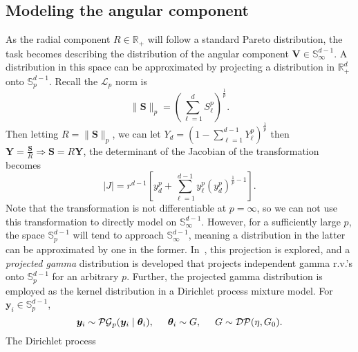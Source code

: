 
\subsection{Modeling the angular component}
As the radial component $R \in {\mathbb R}_+$ will follow a standard Pareto 
    distribution, the task becomes describing the distribution of the angular component 
    $\bm{V}\in {\mathbb S}_{\infty}^{d-1}$.  A distribution in this space can be
    approximated by projecting a distribution in $\mathbb{R}_+^d$ onto $\mathbb{S}_{p}^{d-1}$.
    Recall the $\mathcal{L}_p$ norm is 
    \[
        \lVert \bm{S} \rVert_p = \left(\sum_{\ell = 1}^d S_{\ell}^p\right)^{\frac{1}{p}}.
    \]
    Then letting $R = \lVert \bm{S}\rVert_p$, we can let 
    $Y_d = \left(1 - \sum_{\ell = 1}^{d-1}Y_{\ell}^{p}\right)^{\frac{1}{p}}$ then $\bm{Y} = \frac{\bm{S}}{R}\Rightarrow \bm{S} = R\bm{Y}$, 
    the determinant of the Jacobian of the transformation becomes
    \[
        \lvert J \rvert = r^{d-1}\left[y_d^p + \sum_{\ell = 1}^{d-1}y_{\ell}^p\left(y_d^p\right)^{\frac{1}{p} - 1} \right].
    \]
    Note that the transformation is not differentiable at $p = \infty$, so we can not use this 
    transformation to directly model on ${\mathbb S}_{\infty}^{d-1}$.
    However, for a sufficiently large $p$, the space ${\mathbb S}_p^{d-1}$ will tend
    to approach $\mathbb{S}_{\infty}^{d-1}$, meaning a distribution in the latter can be 
    approximated by one in the former.  In~\cite{trubey:pg}, this projection is explored, and
    a \emph{projected gamma} distribution is developed that projects independent gamma r.v.'s 
    onto $\mathbb{S}_{p}^{d-1}$ for an arbitrary $p$.  Further, the projected gamma distribution is
    employed as the kernel distribution in a Dirichlet process mixture model.  For $\bm{y}_i\in \mathbb{S}_{p}^{d-1}$,
    \[
        \bm{y}_i \sim \mathcal{PG}_{p}(\bm{y}_i\mid\bm{\theta}_i),\hspace{0.5cm}\bm{\theta}_i\sim G,\hspace{0.5cm}G\sim \mathcal{DP}(\eta, G_0).
    \]
    The Dirichlet process 



